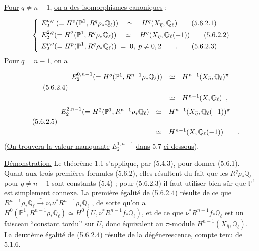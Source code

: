 \underline{Pour} $q \neq n-1$, \underline{on a des isomorphismes canoniques} :

\begin{align}
&E_2^{o,q} \; (=H^{o}(\mathbb{P}^1,R^q\rho_*\mathbb{Q}_\ell)) \quad \simeq \quad H^q(X_{\overline{\eta}},\mathbb{Q}_\ell) \tag{5.6.2.1}\\
\smash{\left\{\rule[-5ex]{0pt}{10ex}\right.}\;&E_2^{2,q}(=H^2(\mathbb{P}^1,R^q\rho_*\mathbb{Q}_\ell)) \quad \simeq \quad H^q(X_{\overline{\eta}},\mathbb{Q}_\ell(-1)) \tag{5.6.2.2}\\
&E_2^{p,q}(=H^p(\mathbb{P}^1,R^q\rho_*\mathbb{Q}_\ell)) \;=\; 0,\; p \neq 0,2 \qquad . \tag{5.6.2.3}
\end{align}
\underline{Pour} $q = n-1$, \underline{on a}

\begin{equation}\tag{5.6.2.4}
\begin{array}{r@{\quad \simeq \quad}l} E_2^{0,n-1}(=H^{o}(\mathbb{P}^1,R^{n-1}\rho_*\mathbb{Q}_\ell)) & H^{n-1}(X_{\overline{\eta}},\mathbb{Q}_\ell)^{\pi}\\[4ex]  & H^{n-1}(X,\mathbb{Q}_\ell) \;\;, \end{array}
\end{equation}
\begin{equation}\tag{5.6.2.5}
\begin{array}{r@{\quad \simeq \quad}l} E_2^{2,n-1}(=H^2(\mathbb{P}^1,R^{n-1}\rho_*\mathbb{Q}_\ell) & H^{n-1}(X_{\overline{\eta}},\mathbb{Q}_\ell(-1))^{\pi}\\[4ex]  & H^{n-1}(X,\mathbb{Q}_\ell(-1)) \qquad . \end{array}
\end{equation}
(\underline{On trouvera la valeur manquante} $E_2^{1,n-1}$ \underline{dans} 5.7 \underline{ci-dessous}).

\underline{Démonstration.} Le théorème 1.1 s'applique, par (5.4.3), pour donner (5.6.1). Quant aux trois premières formules (5.6.2), elles résultent du fait que les $R^q\rho_*\mathbb{Q}_\ell$ pour $q \neq n-1$ sont constants (5.4) ; pour (5.6.2.3) il faut utiliser bien sûr que $\mathbb{P}^1$ est simplement connexe. La première
égalité de (5.6.2.4) résulte de ce que $R^{n-1}\rho_*\mathbb{Q}_{\ell} \xrightarrow{\ \sim\ } \nu_*\nu^*R^{n-1}\rho_*\mathbb{Q}_{\ell}$ , de sorte qu'on a $H^0(\mathbb{P}^1,R^{n-1}\rho_*\mathbb{Q}_{\ell}) \simeq H^0(U,\nu^*R^{n-1}f_*\mathbb{Q}_{\ell})$, et de ce que $\nu^*R^{n-1}f_*\mathbb{Q}_{\ell}$ est un faisceau ``constant tordu'' sur $U$, donc équivalent au $\pi$-module $H^{n-1}(X_{\overline{\eta}},\mathbb{Q}_{\ell})$. La deuxième égalité de (5.6.2.4) résulte de la dégénerescence, compte tenu de 5.1.6.

